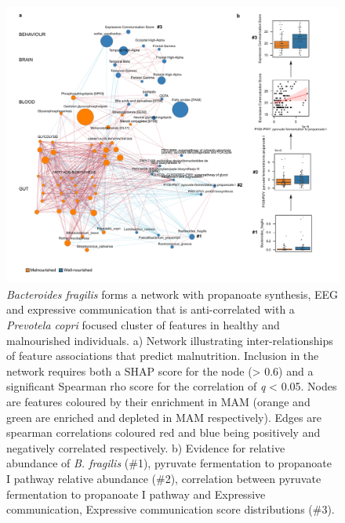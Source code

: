 \documentclass{article}
\begin{document}
\begin{figure}[!htb]
\centering
\includegraphics[scale=0.9]{../../figures/Figure5-network.pdf}
\caption[\textit{Bacteroides fragilis} forms a network with propanoate synthesis, EEG and expressive communication that is anti-correlated with a \textit{P. copri} focused cluster of features in healthy and malnourished individuals]{
	\textit{Bacteroides fragilis} forms a network with propanoate synthesis, EEG and expressive communication that is anti-correlated with a \textit{Prevotela copri} focused cluster of features in healthy and malnourished individuals.
	a) Network illustrating inter-relationships of feature associations that predict malnutrition.
	Inclusion in the network requires both a SHAP score for the node (\textgreater{} 0.6) and a significant Spearman rho score for the correlation of \textit{q} \textless{} 0.05.
	Nodes are features coloured by their enrichment in \gls{MAM} (orange and green are enriched and depleted in \gls{MAM} respectively).
	Edges are spearman correlations coloured red and blue being positively and negatively correlated respectively.
	b) Evidence for relative abundance of \textit{B. fragilis} (\#1), pyruvate fermentation to propanoate I pathway relative abundance (\#2), correlation between pyruvate fermentation to propanoate I pathway and Expressive communication, Expressive communication score distributions (\#3).}
\label{Figure5}
\end{figure}
\end{document}
